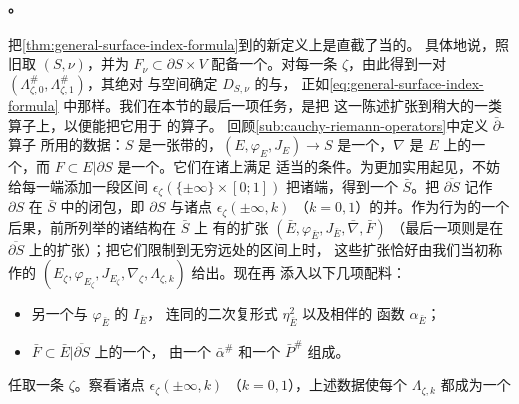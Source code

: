 \paragraph{\trOrientationOperator。}\label{sub:orientation-operators}
把\cref{thm:general-surface-index-formula}\trAdapted{}到\trBrane{}的新定义上是直截了当的。
具体地说，照旧取 $(S,\nu)$，并为\trLagrange\trSubbundle{} $F_\nu\subset\partial S\times V$
配备一个\trBraneStructure。对每一条\trStriplikeEnd{} $\zeta$，由此得到一对%
\trLinear\trLagrange\trBrane{} $(\Lambda_{\zeta,0}^\#,\Lambda_{\zeta,1}^\#)$，其绝对%
\trIndex{}与\trOrientation{}空间确定 $D_{S,\nu}$ 的\trIndex{}与\trDeterminantLine，
正如\eqref{eq:general-surface-index-formula} 中那样。我们在本节的最后一项任务，是把
这一陈述扩张到稍大的一类算子上，以便能把它用于\trInhomogeneous\trPseudoholomorphicMap
的\trLinearization{}算子。
回顾\cref{sub:cauchy-riemann-operators}中定义\trNondegenerate{} $\bar\partial$-算子
所用的数据：$S$ 是一张带\trStriplikeEnd{}的\trRiemann\trSurface，$(E,\varphi_E,J_E)\to S$
是一个\trHermitian\trVectorBundle，$\nabla$ 是 $E$ 上的一个\trConnection，而
$F\subset E|\partial S$ 是一个\trLagrange\trSubbundle。它们在诸\trStriplikeEnd{}上满足
适当的\trAsymptotic{}\trConvergence{}条件。为更加实用起见，不妨给每一端添加一段区间
$\epsilon_\zeta(\{\pm\infty\}\times[0;1])$ 把诸端\trCompactification，得到一个%
\trCorneredBoundary\trSurface{} $\bar{S}$。把 $\overline{\partial S}$ 记作 $\partial S$
在 $\bar{S}$ 中的闭包，即 $\partial S$ 与诸点 $\epsilon_\zeta(\pm\infty,k)$
（$k=0,1$）的并。作为\trAsymptotic{}行为的一个后果，前所列举的诸结构在 $\bar{S}$ 上
有\trCanonical{}的扩张 $(\bar{E},\varphi_{\bar{E}},J_{\bar{E}},\bar{\nabla},\bar{F})$
（最后一项则是在 $\overline{\partial S}$ 上的扩张）；把它们限制到无穷远处的区间上时，
这些扩张恰好由我们当初称作\trLimitingDatum{}的
$(E_\zeta,\varphi_{E_\zeta},J_{E_\zeta},\nabla_\zeta,\Lambda_{\zeta,k})$ 给出。现在再
添入以下几项配料：
\begin{itemize}
\item 另一个与 $\varphi_{\bar{E}}$ \trCompatible{}的\trComplexStructure{} $I_{\bar{E}}$，
      连同\trFibrewise{}的二次复\trVolume{}形式 $\eta_{\bar{E}}^2$ 以及相伴的%
      \trSquaredPhase{}函数 $\alpha_{\bar{E}}$；
\item \trSubbundle{} $\bar{F}\subset\bar{E}|\overline{\partial S}$ 上的一个\trBraneStructure，
      由一个\trGrading{} $\bar{\alpha}^\#$ 和一个 \trPinStructure{} $\bar{P}^\#$ 组成。
\end{itemize}
任取一条\trStriplikeEnd{} $\zeta$。察看诸点 $\epsilon_\zeta(\pm\infty,k)$
（$k=0,1$），上述数据使每个 $\Lambda_{\zeta,k}$ 都成为一个\trLinear\trLagrange\trBrane{}
